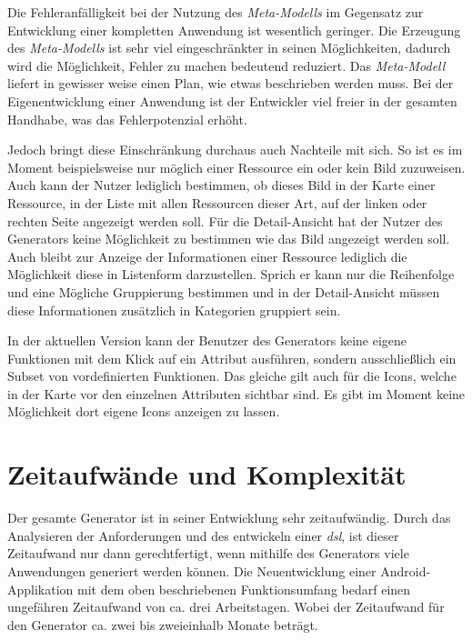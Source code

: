 Die Fehleranfälligkeit bei der Nutzung des \textit{Meta-Modells} im Gegensatz zur Entwicklung einer kompletten Anwendung ist wesentlich geringer. Die Erzeugung des \textit{Meta-Modells} ist sehr viel eingeschränkter in seinen Möglichkeiten, dadurch wird die Möglichkeit, Fehler zu machen bedeutend reduziert. Das \textit{Meta-Modell} liefert in gewisser weise einen Plan, wie etwas beschrieben werden muss. Bei der Eigenentwicklung einer Anwendung ist der Entwickler viel freier in der gesamten Handhabe, was das Fehlerpotenzial erhöht.

\newpage

Jedoch bringt diese Einschränkung durchaus auch Nachteile mit sich. So ist es im Moment beispielsweise nur möglich einer Ressource ein oder kein Bild zuzuweisen. Auch kann der Nutzer lediglich bestimmen, ob dieses Bild in der Karte einer Ressource, in der Liste mit allen Ressourcen dieser Art, auf der linken oder rechten Seite angezeigt werden soll. Für die Detail-Ansicht hat der Nutzer des Generators keine Möglichkeit zu bestimmen wie das Bild angezeigt werden soll.
Auch bleibt zur Anzeige der Informationen einer Ressource lediglich die Möglichkeit diese in Listenform darzustellen. Sprich er kann nur die Reihenfolge und eine Mögliche Gruppierung bestimmen und in der Detail-Ansicht müssen diese Informationen zusätzlich in Kategorien gruppiert sein. 

In der aktuellen Version kann der Benutzer des Generators keine eigene Funktionen mit dem Klick auf ein Attribut ausführen, sondern ausschließlich ein Subset von vordefinierten Funktionen. Das gleiche gilt auch für die Icons, welche in der Karte vor den einzelnen Attributen sichtbar sind. Es gibt im Moment keine Möglichkeit dort eigene Icons anzeigen zu lassen.

\section{Zeitaufwände und Komplexität}

Der gesamte Generator ist in seiner Entwicklung sehr zeitaufwändig. Durch das Analysieren der Anforderungen und des entwickeln einer \textit{\acf{dsl}}, ist dieser Zeitaufwand nur dann gerechtfertigt, wenn mithilfe des Generators viele Anwendungen generiert werden können. Die Neuentwicklung einer Android-Applikation mit dem oben beschriebenen Funktionsumfang bedarf einen ungefähren Zeitaufwand von ca. drei Arbeitstagen. Wobei der Zeitaufwand für den Generator ca. zwei bis zweieinhalb Monate beträgt.

